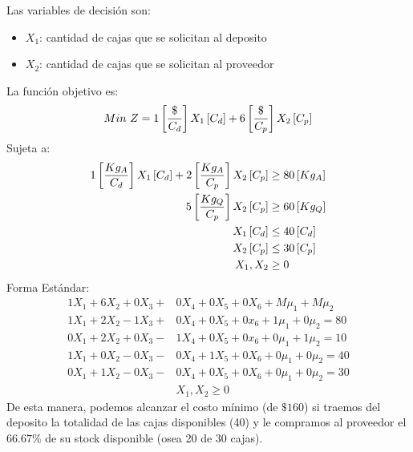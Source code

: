 \documentclass{tarea}
\begin{document}
\begin{homeworkProblem}
Las variables de decisión son:
\begin{itemize}
	\item $X_1$: cantidad de cajas que se solicitan al deposito
	\item $X_2$: cantidad de cajas  que se solicitan al proveedor 
\end{itemize}
La función objetivo es: 
\begin{equation}
	Min\ Z = 1\left[ \frac{\$}{C_d} \right]X_1\left[ C_d \right] + 6\left[ \frac{\$}{C_p} \right]X_2\left[ C_p \right]
\end{equation}
Sujeta a:
\begin{align*}
	1\left[ \frac{Kg_A}{C_d} \right]X_1\left[ C_d \right] + 2\left[ \frac{Kg_A}{C_p} \right]X_2\left[ C_p \right] &\ge 80 \left[ Kg_A \right]\\
	5\left[ \frac{Kg_Q}{C_p} \right]X_2\left[ C_p \right] &\ge 60 \left[ Kg_Q \right] \\
	X_1\left[ C_d \right] &\le 40\left[ C_d \right] \\
	X_2\left[ C_p \right] &\le 30 \left[ C_p \right] \\
	X_1,X_2 &\ge 0
\end{align*}
Forma Estándar:
\begin{align*}
	1X_1 + 6X_2 + 0X_3 + &0X_4 + 0X_5 + 0X_6 + M\mu_1 + M\mu_2 \\
	1X_1 + 2X_2 - 1X_3 +&0X_4 +0X_5 + 0x_6 + 1\mu_1 + 0\mu_2 = 80 \\
	0X_1 + 2X_2 + 0X_3 -&1X_4 +0X_5 + 0x_6 + 0\mu_1 + 1\mu_2 = 10 \\
	1X_1 + 0X_2 - 0X_3 -&0X_4 + 1X_5 + 0X_6 + 0\mu_1 + 0\mu_2 = 40 \\
	0X_1 + 1X_2 - 0X_3 -&0X_4 + 0X_5 + 0X_6 + 0\mu_1 + 0\mu_2 = 30 \\
	&X_1,X_2 \ge 0
\end{align*}
De esta manera, podemos alcanzar el costo mínimo (de $ \$ 160$) si traemos del deposito la totalidad de las cajas disponibles (40) y le compramos al proveedor el $66.67\%$ de su stock disponible (osea 20 de 30 cajas).
\end{homeworkProblem}
\end{document}
